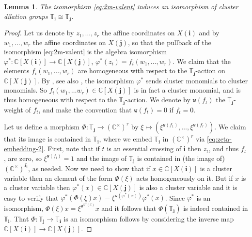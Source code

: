 \documentclass[a4paper, 11pt]{amsart}
\newcommand{\word}[1]{\mathbf{#1}}
\newcommand{\C}{\mathbb{C}}
\newcommand{\wt}{\mathtt{w}}
\newcommand{\dil}[1]{\mathbb{T}_{#1}}
\newcommand{\noness}[1]{I_{#1}}
\newtheorem{lemma}[theorem]{Lemma}%
\theoremstyle{definition}
\begin{document}
\begin{lemma}\label{lem:easy-2m-valent}
The isomorphism \eqref{eq:2m-valent} induces an isomorphism of cluster dilation groups $\dil{\word{i}} \cong \dil{\word{j}}$.
\end{lemma}
\begin{proof}
    Let us denote by $z_1, \dots, z_r$ the affine coordinates on $X(\word{i})$ and by $w_1, \dots, w_r$ the affine coordinates on $X(\word{j})$, so that the pullback of the isomorphism \eqref{eq:2m-valent} is the algebra isomorphism $\varphi^{\ast}: \C[X(\word{i})] \to \C[X(\word{j})]$, $\varphi^{\ast}(z_i) = f_i(w_1, \dots, w_r)$. We claim that the elements $f_i(w_1, \dots, w_r)$ are homogeneous with respect to the $\dil{\word{j}}$-action on $\C[X(\word{j})]$. By \cite[Sects. 4.4, 4.5]{GLSB}, see also \cite[Proposition 4.46]{CGGLSS}, the isomorphism $\varphi^{\ast}$ sends cluster monomials to cluster monomials. So $f_i(w_1, \dots w_r) \in \C[X(\word{j})]$ is in fact a cluster monomial, and is thus homogeneous with respect to the $\dil{\word{j}}$-action. We denote by $\wt(f_t)$ the $\dil{\word{j}}$-weight of $f_t$, and make the convention that $\wt(f_t) = 0$ if $f_t = 0$. 

    Let us define a morphism $\Phi: \dil{\word{j}} \to (\C^{\times})^{r}$ by $\xi \mapsto (\xi^{\wt(f_1)}, \dots, \xi^{\wt(f_r)})$. We claim that its image is contained in $\dil{\word{i}}$, where we embed $\dil{\word{i}}$ in $(\C^{\times})^{r}$ via \eqref{eq:zeta-embedding-2}. First, note that if $t$ is an essential crossing of $\word{i}$ then $z_t$, and thus $f_t$, are zero, so $\xi^{\wt(f_i)} = 1$ and the image of $\dil{\word{j}}$ is contained in (the image of) $(\C^{\times})^{\noness{\word{i}}}$, as needed. Now we need to show that if $x \in \C[X(\word{i})]$ is a cluster variable then an element of the form $\Phi(\xi)$ acts homogeneously on it. But if $x$ is a cluster variable then $\varphi^{\ast}(x) \in \C[X(\word{j})]$ is also a cluster variable and it is easy to verify that $\varphi^{\ast}(\Phi(\xi)x) = \xi^{\wt(\varphi^{\ast}(x))}\varphi^{\ast}(x)$. Since $\varphi^{\ast}$ is an isomorphism, $\Phi(\xi)x = \xi^{\wt^{\varphi^{\ast}(x)}}x$ and it follows that $\Phi(\dil{\word{j}})$ is indeed contained in $\dil{\word{i}}$. That $\Phi: \dil{\word{j}} \to \dil{\word{i}}$ is an isomorphism follows by considering the inverse map $\C[X(\word{i})] \to \C[X(\word{j})]$.  
\end{proof}
\end{document}
